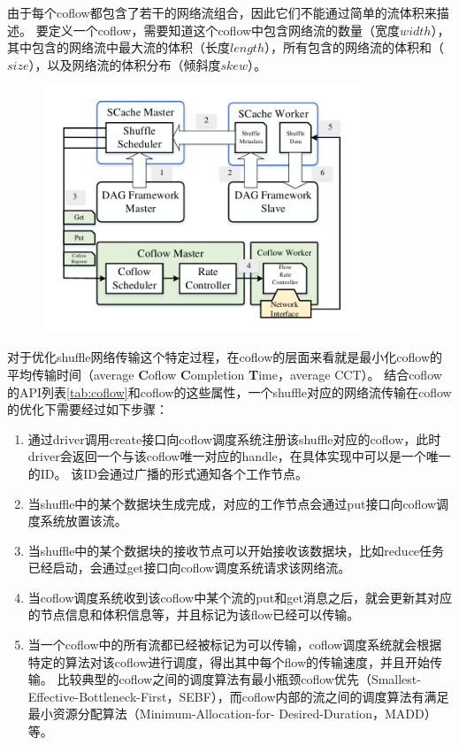 由于每个coflow都包含了若干的网络流组合，因此它们不能通过简单的流体积来描述。
要定义一个coflow，需要知道这个coflow中包含网络流的数量（宽度$width$），其中包含的网络流中最大流的体积（长度$length$），所有包含的网络流的体积和（$size$），以及网络流的体积分布（倾斜度$skew$）。

\begin{figure}[!htp]
    \centering
    \includegraphics[width=0.85\textwidth]{../figure/coflow.pdf}
\end{figure}

对于优化shuffle网络传输这个特定过程，在coflow的层面来看就是最小化coflow的平均传输时间（average \textbf{C}oflow \textbf{C}ompletion \textbf{T}ime，average CCT）。
结合coflow的API列表\ref{tab:coflow}和coflow的这些属性，一个shuffle对应的网络流传输在coflow的优化下需要经过如下步骤：
\begin{enumerate}
	\item 通过driver调用create接口向coflow调度系统注册该shuffle对应的coflow，此时driver会返回一个与该coflow唯一对应的handle，在具体实现中可以是一个唯一的ID。
	该ID会通过广播的形式通知各个工作节点。
	\item 当shuffle中的某个数据块生成完成，对应的工作节点会通过put接口向coflow调度系统放置该流。
	\item 当shuffle中的某个数据块的接收节点可以开始接收该数据块，比如reduce任务已经启动，会通过get接口向coflow调度系统请求该网络流。
	\item 当coflow调度系统收到该coflow中某个流的put和get消息之后，就会更新其对应的节点信息和体积信息等，并且标记为该flow已经可以传输。
	\item 当一个coflow中的所有流都已经被标记为可以传输，coflow调度系统就会根据特定的算法对该coflow进行调度，得出其中每个flow的传输速度，并且开始传输。
	比较典型的coflow之间的调度算法有最小瓶颈coflow优先（Smallest-Effective-Bottleneck-First，SEBF）\cite{varys}，而coflow内部的流之间的调度算法有满足最小资源分配算法（Minimum-Allocation-for-
	Desired-Duration，MADD）\cite{varys}等。
\end{enumerate}

